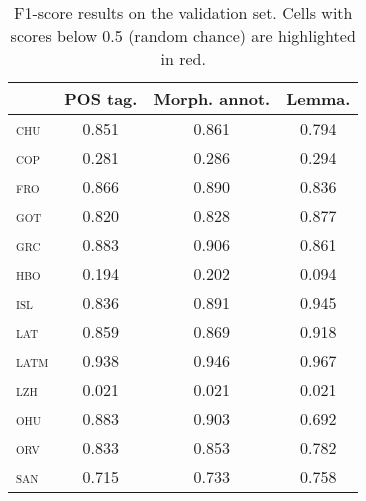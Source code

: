 \documentclass{../acl_latex.tex}
\begin{document}
\begin{table}[t]
\centering
\begin{tabular}{lccc}
\toprule
                 & POS tag. & Morph. annot. & Lemma. \\ \midrule
\textsc{chu}     &  0.851   &  0.861        & 0.794  \\ 
\textsc{cop}     &  \cellcolor{red!25}0.281   & \cellcolor{red!25}  0.286 & \cellcolor{red!25} 0.294  \\ 
\textsc{fro}     &  0.866   &  0.890        & 0.836  \\
\textsc{got}     &  0.820   &  0.828        & 0.877  \\
\textsc{grc}     &  0.883   &  0.906        & 0.861  \\
\textsc{hbo}     &  \cellcolor{red!25}0.194   & \cellcolor{red!25}  0.202 & \cellcolor{red!25} 0.094  \\
\textsc{isl}     &  0.836   &  0.891        & 0.945  \\
\textsc{lat}     &  0.859   &  0.869        & 0.918  \\
\textsc{latm}    &  0.938   &  0.946        & 0.967  \\
\textsc{lzh}     &  \cellcolor{red!25}0.021  & \cellcolor{red!25} 0.021 & \cellcolor{red!25} 0.021  \\
\textsc{ohu}     &  0.883   &  0.903        & 0.692  \\
\textsc{orv}     &  0.833   &  0.853        & 0.782  \\
\textsc{san}     &  0.715   &  0.733        & 0.758  \\ \bottomrule 
\end{tabular}
\caption{
    F1-score results on the validation set.
    Cells with scores below 0.5 (random chance) are highlighted in \colorbox{red!25}{red}.
}
\label{table:validation_results}
\end{table}
\end{document}

